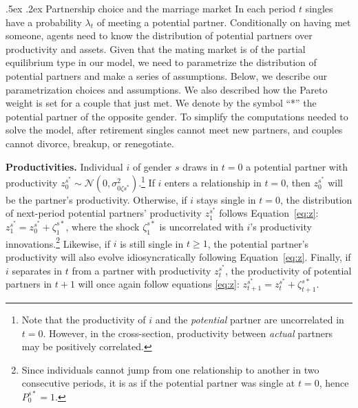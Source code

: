 \documentclass[12pt]{article}
\makeatletter
\numberwithin{table}{section}
\renewcommand\subsection{\@startsection{subsection}{1}{0cm}{-1.5ex \@plus
		-.2ex \@minus -.2ex}%
	{.5ex \@plus.2ex} {\normalfont\bfseries}}
\makeatother
\begin{document}

\subsection{Partnership choice and the marriage market}\label{ssec:marriage_market}
In each period $t$ singles have a probability $\lambda_t$ of meeting a potential partner. Conditionally on having met someone, agents need to know the distribution of potential partners over productivity and assets. Given that the mating market is of the partial equilibrium type in our model, we need to parametrize the distribution of potential partners and make a series of assumptions. Below, we describe our parametrization choices and assumptions. We also described how the Pareto weight is set for a couple that just met. We denote by the symbol ``*'' the potential partner of the opposite gender. To simplify the computations needed to solve the model, after retirement singles cannot meet new partners, and couples cannot divorce, breakup, or renegotiate.

\textbf{Productivities.} Individual $i$ of gender $s$ draws in $t=0$ a potential partner with productivity $z^{s^*}_0\sim\mathcal{N}(0,\sigma^2_{0 \zeta s^*})$.\footnote{Note that the productivity of $i$ and the \textit{potential} partner are uncorrelated in $t=0$. However, in the cross-section,  productivity between \textit{actual} partners may be positively correlated.} If $i$ enters a relationship in $t=0$, then $z^{s^*}_0$ will be the partner's productivity. Otherwise, if $i$ stays single in $t=0$, the distribution of next-period potential partners' productivity $z^{s^*}_1$ follows Equation~\eqref{eq:z}: $z^{s^*}_1=z^{s^*}_0+\zeta^{s*}_1$, where the shock $\zeta^{s*}_1$ is uncorrelated with $i$'s productivity innovations.\footnote{Since individuals cannot jump from one relationship to another in two consecutive periods, it is as if the potential partner was single at $t=0$, hence $P^{s*}_0=1$.} Likewise, if $i$ is still single in $t\geq1$, the potential partner's productivity will also evolve idiosyncratically following Equation~\eqref{eq:z}. Finally, if $i$ separates in $t$ from a partner with productivity $z^{s^*}_t$, the productivity of potential partners in $t+1$ will once again follow equations \eqref{eq:z}: $z^{s^*}_{t+1}=z^{s^*}_t+\zeta^{s*}_{t+1}$.
\end{document}
